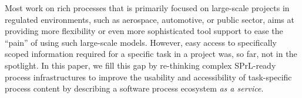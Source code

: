 Most work on rich processes that is primarily focused on large-scale projects in regulated environments, such as aerospace, automotive, or public sector, aims at providing more flexibility or even more sophisticated tool support to ease the ``pain'' of using such large-scale models. However, easy access to specifically scoped information required for a specific task in a project was, so far, not in the spotlight. In this paper, we fill this gap by re-thinking complex SPrL-ready process infrastructures to improve the usability and accessibility of task-specific process content by describing a software process ecosystem \emph{as a service}.